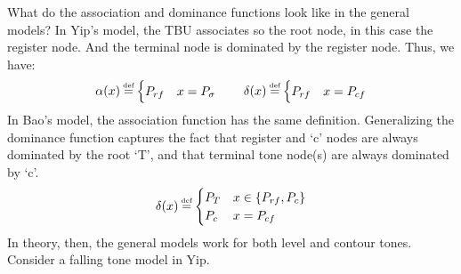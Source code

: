 \documentclass{article}
\newcommand\myeq{\mathrel{\stackrel{\makebox[0pt]{\mbox{\normalfont\tiny def}}}{=}}}
\begin{document}
What do the association and dominance functions look like in the general models? In Yip's model, the TBU associates so the root node, in this case the register node. And the terminal node is dominated by the register node. Thus, we have:
\begin{equation}
\begin{aligned}
\alpha(x) \myeq \begin{cases} P_{rf} & x = P_{\sigma} \end{cases} \qquad \delta(x) \myeq \begin{cases} P_{rf} & x = P_{cf} \end{cases}
\end{aligned}
\end{equation}
In Bao's model, the association function has the same definition. Generalizing the dominance function captures the fact that register and `c' nodes are always dominated by the root `T', and that terminal tone node(s) are always dominated by `c'.
\begin{equation}
\delta(x) \myeq \begin{cases} P_{T} & x \in \{P_{rf}, P_{c}\} \\
				         P_{c} & x = P_{cf} \end{cases}
\end{equation}
In theory, then, the general models work for both level and contour tones. Consider a falling tone model in Yip.
\begin{center}
\hspace{2cm}
\end{center}
\end{document}
